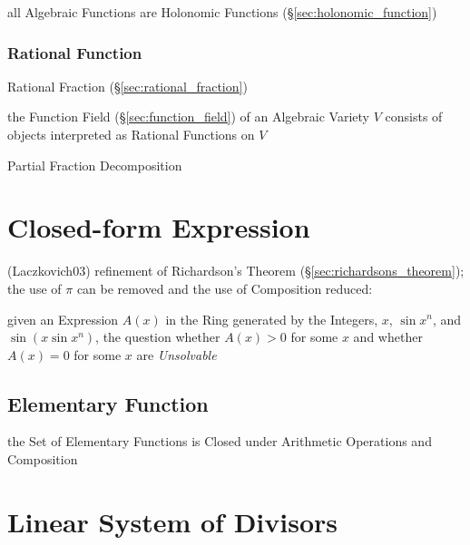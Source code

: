 all Algebraic Functions are Holonomic Functions
(\S\ref{sec:holonomic_function})



\subsubsection{Rational Function}\label{sec:rational_function}

Rational Fraction (\S\ref{sec:rational_fraction})

the Function Field (\S\ref{sec:function_field}) of an Algebraic Variety $V$
consists of objects interpreted as Rational Functions on $V$

Partial Fraction Decomposition



\section{Closed-form Expression}\label{sec:closed_form_expression}

(Laczkovich03) refinement of Richardson's Theorem
(\S\ref{sec:richardsons_theorem}); the use of $\pi$ can be removed and the use
of Composition reduced:

given an Expression $A(x)$ in the Ring generated by the Integers, $x$, $\sin
x^n$, and $\sin(x \sin x^n)$, the question whether $A(x) > 0$ for some $x$ and
whether $A(x) = 0$ for some $x$ are \emph{Unsolvable}



\subsection{Elementary Function}\label{sec:elementary_function}

the Set of Elementary Functions is Closed under Arithmetic Operations and
Composition



\section{Linear System of Divisors}\label{sec:linear_system_of_divisors}

